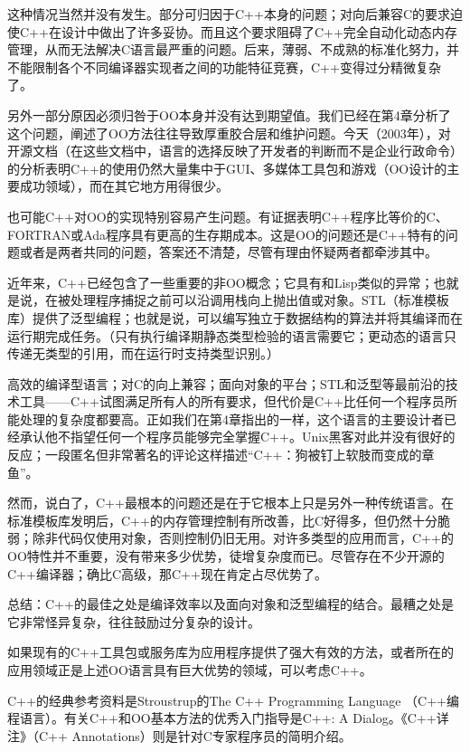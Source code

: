 \documentclass[12pt,oneside]{book}
\begin{document}
这种情况当然并没有发生。部分可归因于C++本身的问题；对向后兼容C的要求迫使C++在设计中做出了许多妥协。而且这个要求阻碍了C++完全自动化动态内存管理，从而无法解决C语言最严重的问题。后来，薄弱、不成熟的标准化努力，并不能限制各个不同编译器实现者之间的功能特征竞赛，C++变得过分精微复杂了。

另外一部分原因必须归咎于OO本身并没有达到期望值。我们已经在第4章分析了这个问题，阐述了OO方法往往导致厚重胶合层和维护问题。今天（2003年），对开源文档（在这些文档中，语言的选择反映了开发者的判断而不是企业行政命令）的分析表明C++的使用仍然大量集中于GUI、多媒体工具包和游戏（OO设计的主要成功领域），而在其它地方用得很少。

也可能C++对OO的实现特别容易产生问题。有证据表明C++程序比等价的C、FORTRAN或Ada程序具有更高的生存期成本。这是OO的问题还是C++特有的问题或者是两者共同的问题，答案还不清楚，尽管有理由怀疑两者都牵涉其中\cite{Hatton98}。

近年来，C++已经包含了一些重要的非OO概念；它具有和Lisp类似的异常；也就是说，在被处理程序捕捉之前可以沿调用栈向上抛出值或对象。STL（标准模板库）提供了泛型编程；也就是说，可以编写独立于数据结构的算法并将其编译而在运行期完成任务。（只有执行编译期静态类型检验的语言需要它；更动态的语言只传递无类型的引用，而在运行时支持类型识别。）

高效的编译型语言；对C的向上兼容；面向对象的平台；STL和泛型等最前沿的技术工具——C++试图满足所有人的所有要求，但代价是C++比任何一个程序员所能处理的复杂度都要高。正如我们在第4章指出的一样，这个语言的主要设计者已经承认他不指望任何一个程序员能够完全掌握C++。Unix黑客对此并没有很好的反应；一段匿名但非常著名的评论这样描述“C++：狗被钉上软肢而变成的章鱼”。

然而，说白了，C++最根本的问题还是在于它根本上只是另外一种传统语言。在标准模板库发明后，C++的内存管理控制有所改善，比C好得多，但仍然十分脆弱；除非代码仅使用对象，否则控制仍旧无用。对许多类型的应用而言，C++的OO特性并不重要，没有带来多少优势，徒增复杂度而已。尽管存在不少开源的C++编译器；确比C高级，那C++现在肯定占尽优势了。

总结：C++的最佳之处是编译效率以及面向对象和泛型编程的结合。最糟之处是它非常怪异复杂，往往鼓励过分复杂的设计。

如果现有的C++工具包或服务库为应用程序提供了强大有效的方法，或者所在的应用领域正是上述OO语言具有巨大优势的领域，可以考虑C++。

C++的经典参考资料是Stroustrup的The C++ Programming Language （C++编程语言）\cite{Stroustrup}。有关C++和OO基本方法的优秀入门指导是C++: A Dialog\cite{Heller}。《C++详注》（C++ Annotations）\cite{Brokken}则是针对C专家程序员的简明介绍。
\end{document}
